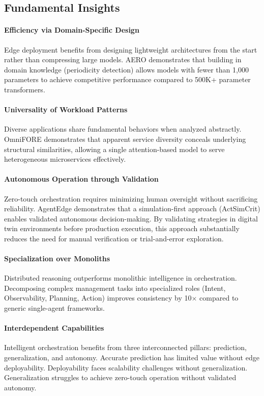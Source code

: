 \subsection{Fundamental Insights}
\label{subsec:ch6_fundamental_insights}

\paragraph{Efficiency via Domain-Specific Design}
Edge deployment benefits from designing lightweight architectures from the start rather than compressing large models. \ac{AERO} demonstrates that building in domain knowledge (periodicity detection) allows models with fewer than 1,000 parameters to achieve competitive performance compared to 500K+ parameter transformers.

\paragraph{Universality of Workload Patterns}
Diverse applications share fundamental behaviors when analyzed abstractly. \ac{OmniFORE} demonstrates that apparent service diversity conceals underlying structural similarities, allowing a single attention-based model to serve heterogeneous microservices effectively.

\paragraph{Autonomous Operation through Validation}
Zero-touch orchestration requires minimizing human oversight without sacrificing reliability. \ac{AgentEdge} demonstrates that a simulation-first approach (\ac{ActSimCrit}) enables validated autonomous decision-making. By validating strategies in digital twin environments before production execution, this approach substantially reduces the need for manual verification or trial-and-error exploration.

\paragraph{Specialization over Monoliths}
Distributed reasoning outperforms monolithic intelligence in orchestration. Decomposing complex management tasks into specialized roles (Intent, Observability, Planning, Action) improves consistency by 10$\times$ compared to generic single-agent frameworks.

\paragraph{Interdependent Capabilities}
Intelligent orchestration benefits from three interconnected pillars: prediction, generalization, and autonomy. Accurate prediction has limited value without edge deployability. Deployability faces scalability challenges without generalization. Generalization struggles to achieve zero-touch operation without validated autonomy.

